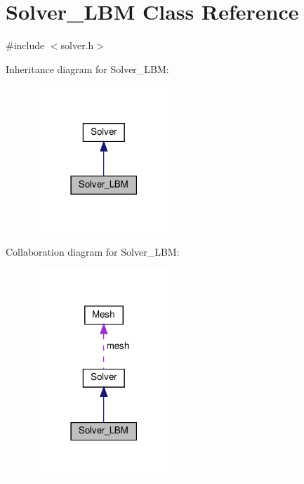 \hypertarget{classSolver__LBM}{}\section{Solver\+\_\+\+L\+BM Class Reference}
\label{classSolver__LBM}


{\ttfamily \#include $<$solver.\+h$>$}



Inheritance diagram for Solver\+\_\+\+L\+BM\+:
\nopagebreak
\begin{figure}[H]
\begin{center}
\leavevmode
\includegraphics[width=150pt]{classSolver__LBM__inherit__graph}
\end{center}
\end{figure}


Collaboration diagram for Solver\+\_\+\+L\+BM\+:
\nopagebreak
\begin{figure}[H]
\begin{center}
\leavevmode
\includegraphics[width=150pt]{classSolver__LBM__coll__graph}
\end{center}
\end{figure}
